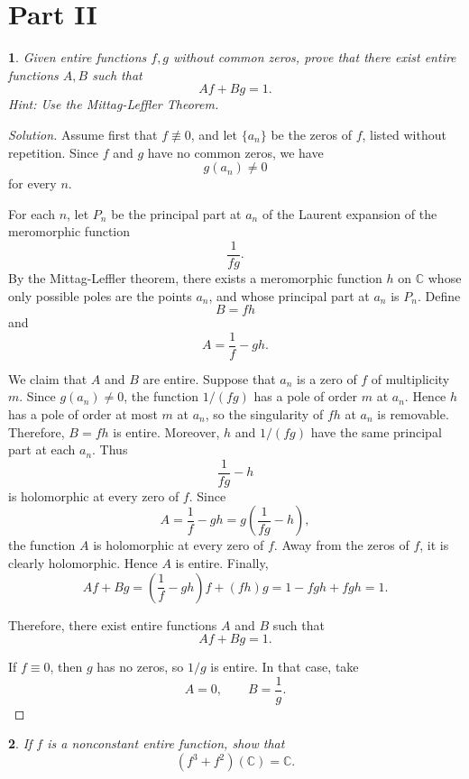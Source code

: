 \documentclass[12pt, a4paper]{report}
\theoremstyle{spaced}
\newtheorem{exercise}{}
\begin{document}
\section{Part II}
\begin{exercise}
	Given entire functions \(f,g\) without common zeros, prove that there exist entire
	functions \(A,B\) such that
	\[
		Af+Bg=1.
	\]
	Hint: Use the Mittag-Leffler Theorem.
\end{exercise}
\begin{proof}[Solution]
	Assume first that \(f \not\equiv 0\), and let \(\{a_n\}\) be the zeros of \(f\), listed without repetition. Since \(f\) and \(g\) have no common zeros, we have
	\[
		g(a_n)\neq 0
	\]
	for every \(n\).

	For each \(n\), let \(P_n\) be the principal part at \(a_n\) of the Laurent expansion of the meromorphic function
	\[
		\frac{1}{fg}.
	\]
	By the Mittag-Leffler theorem, there exists a meromorphic function \(h\) on \(\mathbb{C}\) whose only possible poles are the points \(a_n\), and whose principal part at \(a_n\) is \(P_n\).
	Define
	\[
		B=fh
	\]
	and
	\[
		A=\frac{1}{f}-gh.
	\]

	We claim that \(A\) and \(B\) are entire. Suppose that \(a_n\) is a zero of \(f\) of multiplicity \(m\). Since \(g(a_n)\neq 0\), the function \(1/(fg)\) has a pole of order \(m\) at \(a_n\). Hence \(h\) has a pole of order at most \(m\) at \(a_n\), so the singularity of \(fh\) at \(a_n\) is removable. Therefore, \(B=fh\) is entire.
	Moreover, \(h\) and \(1/(fg)\) have the same principal part at each \(a_n\). Thus
	\[
		\frac{1}{fg}-h
	\]
	is holomorphic at every zero of \(f\). Since
	\[
		A
		=
		\frac{1}{f}-gh
		=
		g\left(\frac{1}{fg}-h\right),
	\]
	the function \(A\) is holomorphic at every zero of \(f\). Away from the zeros of \(f\), it is clearly holomorphic. Hence \(A\) is entire.
	Finally,
	\[
		Af+Bg
		=
		\left(\frac{1}{f}-gh\right)f+(fh)g
		=
		1-fgh+fgh
		=
		1.
	\]

	Therefore, there exist entire functions \(A\) and \(B\) such that
	\[
		Af+Bg=1.
	\]

	If \(f\equiv 0\), then \(g\) has no zeros, so \(1/g\) is entire. In that case, take
	\[
		A=0,
		\qquad
		B=\frac{1}{g}.
	\]
\end{proof}

\begin{exercise}
	If \(f\) is a nonconstant entire function, show that
	\[
		(f^3+f^2)(\mathbb{C})=\mathbb{C}.
	\]
\end{exercise}
\end{document}
